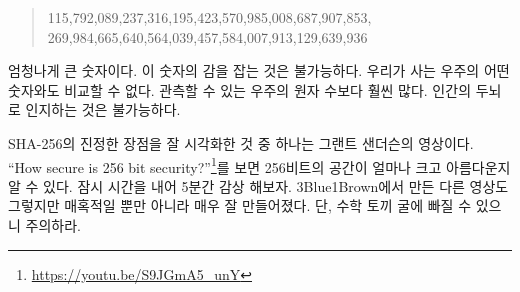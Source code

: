 \begin{comment}
\begin{quotation}\begin{samepage}
    115 quattuorvigintillion 792 trevigintillion 89 duovigintillion 237
    unvigintillion 316 vigintillion 195 novemdecillion 423 octodecillion 570
    septendecillion 985 sexdecillion 8 quindecillion 687 quattuordecillion 907
    tredecillion 853 duodecillion 269 undecillion 984 decillion 665 nonillion
    640 octillion 564 septillion 39 sextillion 457 quintillion 584 quadrillion 7
    trillion 913 billion 129 million 639 thousand 936.
\end{samepage}\end{quotation}
\end{comment}
\begin{quotation}
	\begin{samepage}
		115,792,089,237,316,195,423,570,985,008,687,907,853,
		269,984,665,640,564,039,457,584,007,913,129,639,936
		\end{samepage}
\end{quotation}

\begin{comment}
That's a lot of nonillions! Wrapping your head around this number is
pretty much impossible. There is nothing in the physical universe to
compare it to. It is far larger than the number of atoms in the
observable universe. The human brain simply isn't made to make sense of
it.
\end{comment}
엄청나게 큰 숫자이다. 이 숫자의 감을 잡는 것은 불가능하다. 
우리가 사는 우주의 어떤 숫자와도 비교할 수 없다.
관측할 수 있는 우주의 원자 수보다 훨씬 많다. 
인간의 두뇌로 인지하는 것은 불가능하다.

\newpage

\begin{comment}
One of the best visualizations of the true strength of SHA-256 is a video by
Grant Sanderson. Aptly named \textit{\enquote{How secure is 256 bit
security?}}\footnote{Watch the video at \url{https://youtu.be/S9JGmA5_unY}} it
beautifully shows how large a 256-bit space is. Do yourself a favor and take the
five minutes to watch it. As all other \textit{3Blue1Brown} videos it is not
only fascinating but also exceptionally well made. Warning: You might fall down
a math rabbit hole.
\end{comment}
SHA-256의 진정한 장점을 잘 시각화한 것 중 하나는 그랜트 샌더슨의 영상이다.
\enquote{How secure is 256 bit
		security?}\footnote{\url{https://youtu.be/S9JGmA5_unY}}를 보면
256비트의 공간이 얼마나 크고 아름다운지 알 수 있다. 잠시 시간을 내어 5분간 감상 해보자.
3Blue1Brown에서 만든 다른 영상도 그렇지만 매혹적일 뿐만 아니라 매우 잘 만들어졌다.
단, 수학 토끼 굴에 빠질 수 있으니 주의하라.
	
